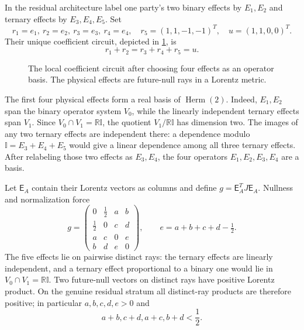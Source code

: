 \documentclass[11pt]{article}
\theoremstyle{definition}
\newcommand{\Herm}{\operatorname{Herm}}
\newcommand{\id}{\mathbb I}
\newcommand{\R}{\mathbb R}
\begin{document}
In the residual architecture label one party's two binary effects by
\(E_1,E_2\) and ternary effects by \(E_3,E_4,E_5\). Set
\[
r_1=e_1,\ r_2=e_2,\ r_3=e_3,\ r_4=e_4,\quad
r_5=(1,1,-1,-1)^T,\quad u=(1,1,0,0)^T.
\]
Their unique coefficient circuit, depicted in \cref{fig:circuit}, is
\[
r_1+r_2=r_3+r_4+r_5=u.
\]

\begin{figure}[t]
\centering

\caption{The local coefficient circuit after choosing four effects as an
operator basis. The physical effects are future-null rays in a Lorentz
metric.}
\label{fig:circuit}
\end{figure}

The first four physical effects form a real basis of \(\Herm(2)\). Indeed,
\(E_1,E_2\) span the binary operator system \(V_0\), while the linearly
independent ternary effects span \(V_1\). Since
\(V_0\cap V_1=\R\id\), the quotient \(V_1/\R\id\) has dimension two.
The images of any two ternary effects are independent there: a dependence
modulo \(\id=E_3+E_4+E_5\) would give a linear dependence among all three
ternary effects. After relabeling those two effects as \(E_3,E_4\), the four
operators \(E_1,E_2,E_3,E_4\) are a basis.

Let \(\mathsf E_A\) contain their Lorentz vectors as columns and define
\(g=\mathsf E_A^TJ\mathsf E_A\). Nullness and normalization force
\begin{equation}
\label{eq:metric}
g=
\begin{pmatrix}
0&\tfrac12&a&b\\
\tfrac12&0&c&d\\
a&c&0&e\\
b&d&e&0
\end{pmatrix},
\qquad e=a+b+c+d-\tfrac12.
\end{equation}
The five effects lie on pairwise distinct rays: the ternary effects are
linearly independent, and a ternary effect proportional to a binary one
would lie in \(V_0\cap V_1=\R\id\). Two future-null vectors on distinct rays
have positive Lorentz product.
On the genuine residual stratum all distinct-ray products are therefore
positive; in particular \(a,b,c,d,e>0\) and
\[
a+b,c+d,a+c,b+d<\frac12.
\]
\end{document}
